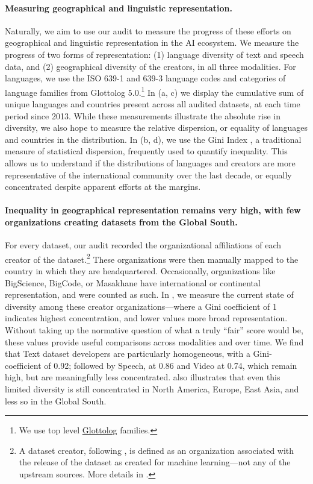 \paragraph{Measuring geographical and linguistic representation.}
Naturally, we aim to use our audit to measure the progress of these efforts on geographical and linguistic representation in the AI ecosystem.
We measure the progress of two forms of representation: (1) language diversity of text and speech data, and (2) geographical diversity of the creators, in all three modalities.
For languages, we use the ISO 639-1 and 639-3 language codes and categories of language families from Glottolog 5.0.\footnote{We use top level \href{https://glottolog.org/}{Glottolog} families.}
In (a, c) we display the cumulative sum of unique languages and countries present across all audited datasets, at each time period since 2013.
While these measurements illustrate the absolute rise in diversity, we also hope to measure the relative dispersion, or equality of languages and countries in the distribution.
In (b, d), we use the Gini Index \citep{e7461144-3bdb-3344-8d83-b11a52be7f2f, atkinson1970measurement}, a traditional measure of statistical dispersion, frequently used to quantify inequality.
This allows us to understand if the distributions of languages and creators are more representative of the international community over the last decade, or equally concentrated despite apparent efforts at the margins.

\vspace{-2mm}
\paragraph{Inequality in geographical representation remains very high, with few organizations creating datasets from the Global South.}
For every dataset, our audit recorded the organizational affiliations of each creator of the dataset.\footnote{A dataset creator, following \citep{longpre2023data}, is defined as an organization associated with the release of the dataset as created for machine learning---not any of the upstream sources. More details in .}
These organizations were then manually mapped to the country in which they are headquartered. 
Occasionally, organizations like BigScience, BigCode, or Masakhane have international or continental representation, and were counted as such.
In , we measure the current state of diversity among these creator organizations---where a Gini coefficient of 1 indicates highest concentration, and lower values more broad representation.
Without taking up the normative question of what a truly ``fair'' score would be, these values provide useful comparisons across modalities and over time.
We find that Text dataset developers are particularly homogeneous, with a Gini-coefficient of 0.92; followed by Speech, at 0.86 and Video at 0.74, which remain high, but are meaningfully less concentrated.  also illustrates that even this limited diversity is still concentrated in North America, Europe, East Asia, and less so in the Global South.


